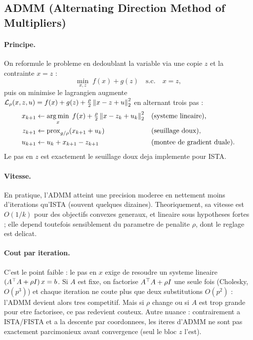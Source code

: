 \subsection{ADMM (Alternating Direction Method of Multipliers)}

\paragraph{Principe.} On reformule le probleme en dedoublant la variable via une
copie $z$ et la contrainte $x = z$ :
\[
  \min_{x, z}\; f(x) + g(z) \quad\text{s.c.}\quad x = z,
\]
puis on minimise le lagrangien augmente
$\mathcal{L}_\rho(x,z,u) = f(x) + g(z) + \tfrac{\rho}{2}\left\lVert x - z + u \right\rVert_2^2$ en
alternant trois pas :
\[
\begin{aligned}
  x_{k+1} &\leftarrow \operatorname*{arg\,min}_x\; f(x) + \tfrac{\rho}{2}\left\lVert x - z_k + u_k \right\rVert_2^2
            && \text{(systeme lineaire),}\\
  z_{k+1} &\leftarrow \operatorname{prox}_{g/\rho}(x_{k+1} + u_k)
            && \text{(seuillage doux),}\\
  u_{k+1} &\leftarrow u_k + x_{k+1} - z_{k+1}
            && \text{(montee de gradient duale).}
\end{aligned}
\]
Le pas en $z$ est exactement le seuillage doux deja implemente pour ISTA.

\paragraph{Vitesse.} En pratique, l'ADMM atteint une precision moderee en
nettement moins d'iterations qu'ISTA (souvent quelques dizaines). Theoriquement,
sa vitesse est $O(1/k)$ pour des objectifs convexes generaux, et lineaire sous
hypotheses fortes ; elle depend toutefois sensiblement du parametre de penalite
$\rho$, dont le reglage est delicat.

\paragraph{Cout par iteration.} C'est le point faible : le pas en $x$ exige de
resoudre un systeme lineaire $(A^{\top} A + \rho I)\,x = b$. Si $A$ est fixe, on
factorise $A^{\top} A + \rho I$ une seule fois (Cholesky, $O(p^3)$) et chaque
iteration ne coute plus que deux substitutions $O(p^2)$ : l'ADMM devient alors
tres competitif. Mais si $\rho$ change ou si $A$ est trop grande pour etre
factorisee, ce pas redevient couteux. Autre nuance : contrairement a ISTA/FISTA
et a la descente par coordonnees, les iteres d'ADMM ne sont pas exactement
parcimonieux avant convergence (seul le bloc $z$ l'est).

